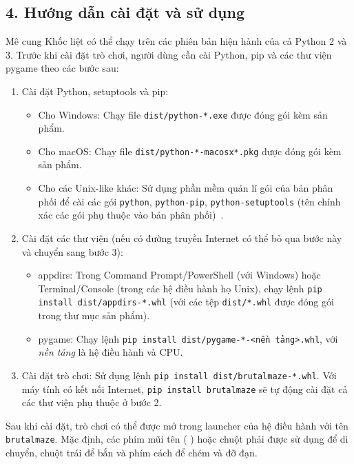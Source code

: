 \documentclass[a4paper,12pt]{article}
\begin{document}
\subsection*{4. Hướng dẫn cài đặt và sử dụng}
Mê cung Khốc liệt có thể chạy trên các phiên bản hiện hành của cả Python 2 và
3. Trước khi cài đặt trò chơi, người dùng cần cài Python, pip và các thư viện
pygame theo các bước sau:
\begin{enumerate}
  \item Cài đặt Python, setuptools và pip:
    \begin{itemize}
      \item Cho Windows: Chạy file \verb|dist/python-*.exe| được đóng gói kèm
        sản phẩm.
      \item Cho macOS: Chạy file \verb|dist/python-*-macosx*.pkg| được đóng gói
        kèm sản phẩm.
      \item Cho các Unix-like khác: Sử dụng phần mềm quản lí gói của bản phân
        phối để cài các gói \verb|python|, \verb|python-pip|,
        \verb|python-setuptools| (tên chính xác các gói phụ thuộc vào bản phân
        phối)~\cite{nixpip}.
    \end{itemize}
  \item Cài đặt các thư viện (nếu có đường truyền Internet có thể bỏ qua bước
    này và chuyển sang bước 3):
    \begin{itemize}
      \item appdirs: Trong Command Prompt/PowerShell (với Windows) hoặc
        \mbox{Terminal/Console} (trong các hệ điều hành họ Unix), chạy lệnh
        \verb|pip install dist/appdirs-*.whl| (với các tệp \verb|dist/*.whl|
        được đóng gói trong thư mục sản phẩm).
      \item pygame: Chạy lệnh \verb|pip install dist/pygame-*-<nền tảng>.whl|,
        với \emph{nền tảng} là hệ điều hành và CPU.
    \end{itemize}
  \item Cài đặt trò chơi: Sử dụng lệnh \verb|pip install dist/brutalmaze-*.whl|.
    Với máy tính có kết nối Internet, \verb|pip install brutalmaze| sẽ tự động
    cài đặt cả các thư viện phụ thuộc ở bước 2.
\end{enumerate}

Sau khi cài đặt, trò chơi có thể được mở trong launcher của hệ điều hành với
tên \verb|brutalmaze|. Mặc định, các phím mũi tên (\textuparrow \textleftarrow
\textdownarrow \textrightarrow) hoặc chuột phải được sử dụng để di chuyển,
chuột trái để bắn và phím cách để chém và đỡ đạn.
\end{document}
